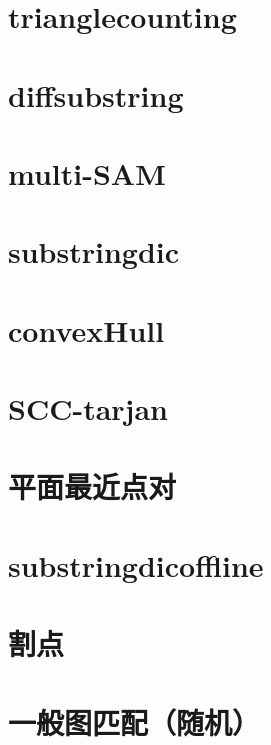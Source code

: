 \section{trianglecounting}

\section{diffsubstring}

\section{multi-SAM}

\section{substringdic}

\section{convexHull}

\section{SCC-tarjan}

\section{平面最近点对}

\section{substringdicoffline}

\section{割点}

\section{一般图匹配（随机）}

